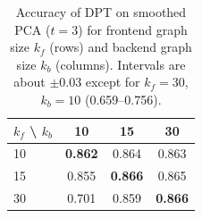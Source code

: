 \documentclass[12pt,a4paper]{article}
\begin{document}
\begin{table}[ht]
\centering\small
\caption{Accuracy of DPT on smoothed PCA ($t=3$) for frontend graph size $k_f$ (rows) and
backend graph size $k_b$ (columns). Intervals are about $\pm 0.03$ except for $k_f=30$, $k_b=10$
(0.659--0.756).}
\label{tab:kcross}
\begin{tabular}{lccc}
\toprule
$k_f$ \textbackslash{} $k_b$ & 10 & 15 & 30 \\
\midrule
10 & \textbf{0.862} & 0.864 & 0.863 \\
15 & 0.855 & \textbf{0.866} & 0.865 \\
30 & 0.701 & 0.859 & \textbf{0.866} \\
\bottomrule
\end{tabular}
\end{table}
\end{document}

